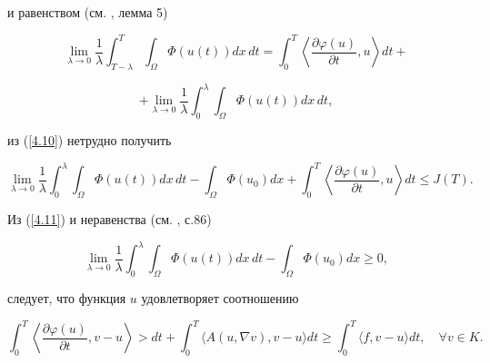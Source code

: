и равенством (см. \cite{PT}, лемма 5)


$$


\lim_{\lambda \to 0} \frac{1}{\lambda}


\int^{T}_{T-\lambda} \int_{\Omega}


\Phi (u(t)) dx\, dt =


\int^{T}_{0}


\left\langle \frac{\partial \varphi (u)}{\partial t} , u \right\rangle dt +


$$


$$


+ \lim_{\lambda \to 0} \frac{1}{\lambda}


\int^{\lambda}_{0} \int_{\Omega}


\Phi (u(t)) dx\, dt,


$$


из (\ref{4.10}) нетрудно получить


\begin{equation}


\lim_{\lambda \to 0} \frac{1}{\lambda}


\int^{\lambda}_{0} \int_{\Omega}


\Phi (u(t)) dx\, dt -


\int_{\Omega}


\Phi (u_0) dx +


\int^{T}_{0}


\left\langle \frac{\partial \varphi (u)}{\partial t} , u\right\rangle dt \le


J(T). \label{4.11}






\end{equation}


Из (\ref{4.11}) и неравенства (см. \cite{PT}, с.86)


$$


\lim_{\lambda \to 0} \frac{1}{\lambda}


\int^{\lambda}_{0} \int_{\Omega}


\Phi (u(t)) dx\, dt -


\int_{\Omega}


\Phi (u_0) dx  \ge 0,


$$


следует, что функция $u$ удовлетворяет соотношению


\begin{equation}


\int^{T}_{0} \left\langle \frac{\partial\varphi (u)}{\partial t} ,


v - u \right\rangle> dt +


\int^{T}_{0} \langle A( u,\nabla v), v - u \rangle dt 


\ge \int^{T}_{0} \langle f , v - u \rangle dt, \quad \forall v \in K.


\label{*n}


\end{equation}


